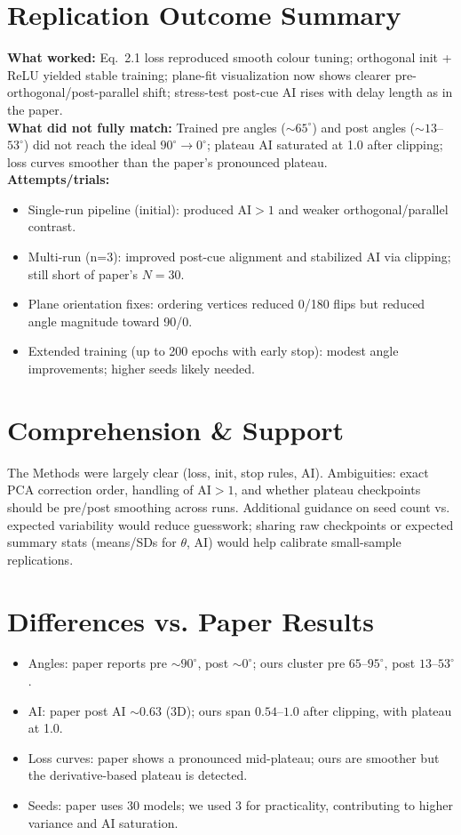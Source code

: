 \documentclass{article}
\begin{document}
\section{Replication Outcome Summary}
\textbf{What worked:} Eq.~2.1 loss reproduced smooth colour tuning; orthogonal init + ReLU yielded stable training; plane-fit visualization now shows clearer pre-orthogonal/post-parallel shift; stress-test post-cue AI rises with delay length as in the paper. \\
\textbf{What did not fully match:} Trained pre angles ($\sim65^\circ$) and post angles ($\sim13$--$53^\circ$) did not reach the ideal $90^\circ \rightarrow 0^\circ$; plateau AI saturated at 1.0 after clipping; loss curves smoother than the paper’s pronounced plateau. \\
\textbf{Attempts/trials:} 
\begin{itemize}[leftmargin=*]
    \item Single-run pipeline (initial): produced AI$>1$ and weaker orthogonal/parallel contrast.
    \item Multi-run (n=3): improved post-cue alignment and stabilized AI via clipping; still short of paper’s $N=30$.
    \item Plane orientation fixes: ordering vertices reduced 0/180 flips but reduced angle magnitude toward 90/0.
    \item Extended training (up to 200 epochs with early stop): modest angle improvements; higher seeds likely needed.
\end{itemize}

\section{Comprehension \& Support}
The Methods were largely clear (loss, init, stop rules, AI). Ambiguities: exact PCA correction order, handling of AI$>1$, and whether plateau checkpoints should be pre/post smoothing across runs. Additional guidance on seed count vs. expected variability would reduce guesswork; sharing raw checkpoints or expected summary stats (means/SDs for $\theta$, AI) would help calibrate small-sample replications.

\section{Differences vs. Paper Results}
\begin{itemize}[leftmargin=*]
    \item Angles: paper reports pre $\sim90^\circ$, post $\sim0^\circ$; ours cluster pre $65$--$95^\circ$, post $13$--$53^\circ$.
    \item AI: paper post AI $\sim0.63$ (3D); ours span $0.54$--$1.0$ after clipping, with plateau at 1.0.
    \item Loss curves: paper shows a pronounced mid-plateau; ours are smoother but the derivative-based plateau is detected.
    \item Seeds: paper uses 30 models; we used 3 for practicality, contributing to higher variance and AI saturation.
\end{itemize}
\end{document}
